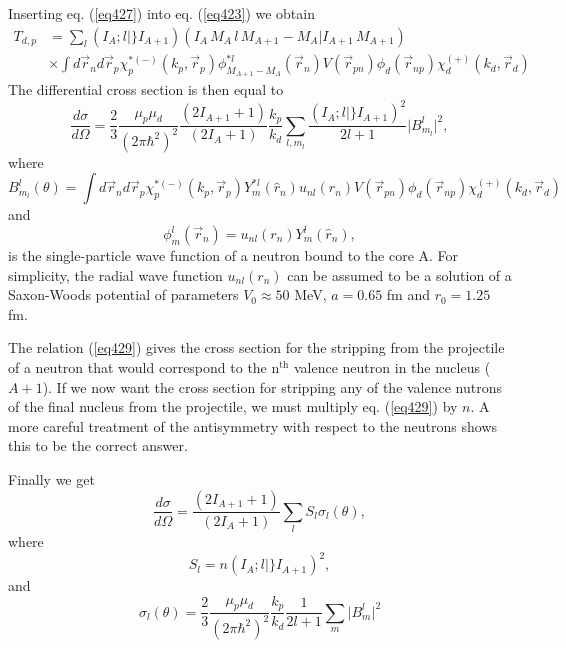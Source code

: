 Inserting eq. (\ref{eq427}) into eq. (\ref{eq423}) we obtain
 \begin{equation}\label{eq428}
 \begin{split}
T_{d,p}&= \sum_l (I_A;l \vert \} I_{A+1}) (I_A\, M_A\, l\, M_{A+1}-M_A \vert I_{A+1}\,M_{A+1})  \\
&\times\int d\vec{r}_n d \vec{r}_p \chi^{* (-)}_p(k_p,\vec{r}_p) \phi_{M_{A+1}-M_A}^{*l}(\vec{r}_n)
V(\vec r_{pn}) \phi_d(\vec r_{np})
\chi^{(+)}_d(k_d,\vec{r}_d)
\end{split}
\end{equation}
The differential cross section is then equal to
\begin{equation}\label{eq429}
\frac{d \sigma}{d \Omega} = \frac{2}{3} \frac{\mu_p \mu_d}{(2\pi \hbar^2)^2}\frac{(2I_{A+1}+1)}{(2I_A+1)}
\frac{k_p}{k_d}\sum_{l,m_l}\frac{(I_A;l \vert \} I_{A+1})^2}{2l+1} \vert B_{m_l}^l\vert ^2,
\end{equation}
where
\begin{equation}\label{eq430}
B_{m_l}^l(\theta)=\int d\vec{r}_n d \vec{r}_p \chi^{* (-)}_p(k_p,\vec{r}_p) Y_m^{*l}(\hat r_n) u_{nl}(r_n)
V(\vec r_{pn}) \phi_d(\vec r_{np})
\chi^{(+)}_d(k_d,\vec{r}_d)
\end{equation}
and
\begin{equation}\label{eqC6E10}
\phi_m^{l}(\vec{r}_n)=u_{nl}(r_n) Y_m^{l}(\hat r_n),
\end{equation}
is the single-particle wave function of a neutron bound to  the core A. For simplicity, the radial wave function $u_{nl}(r_n)$ can be assumed to be a solution of a Saxon-Woods potential of parameters $V_0\approx 50$ MeV, $a=0.65$ fm and $r_0=1.25$ fm.



The relation (\ref{eq429}) gives the cross section for the stripping from the projectile of a neutron that would correspond to the n$^{\mathrm{th}}$ valence neutron in the nucleus ($A+1$). If we now want the cross section for stripping any of the valence nutrons of the final nucleus from the projectile, we must multiply eq. (\ref{eq429}) by $n$. A more careful treatment of the antisymmetry with respect to the neutrons shows this to be the correct answer.


Finally we get
\begin{equation}\label{eq432}
\frac{d \sigma}{d \Omega}=\frac{(2I_{A+1}+1)}{(2I_A+1)} \sum_l S_l \sigma_l(\theta),
\end{equation}
where
\begin{equation}\label{eq433}
S_l= n (I_A;l \vert \} I_{A+1})^2,
\end{equation}
and
\begin{equation}\label{eq434}
\sigma_l(\theta)=\frac{2}{3} \frac{\mu_p \mu_d}{(2\pi \hbar^2)^2}
\frac{k_p}{k_d}\frac{1}{2l+1}\sum_{m} \vert B_{m}^l\vert^2
\end{equation}


